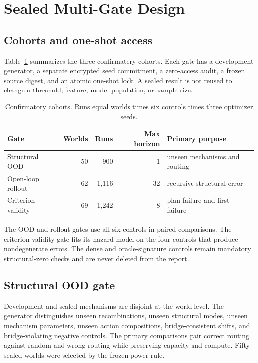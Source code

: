 \section{Sealed Multi-Gate Design}
\label{sec:design}

\subsection{Cohorts and one-shot access}

Table~\ref{tab:gates} summarizes the three confirmatory cohorts.  Each gate has
a development generator, a separate encrypted seed commitment, a zero-access
audit, a frozen source digest, and an atomic one-shot lock.  A sealed result is
not reused to change a threshold, feature, model population, or sample size.

\begin{table}[ht]
\centering
\caption{Confirmatory cohorts.  Runs equal worlds times six controls times
three optimizer seeds.}
\label{tab:gates}
\begin{tabular}{lrrrl}
\toprule
Gate & Worlds & Runs & Max horizon & Primary purpose \\
\midrule
Structural OOD & 50 & 900 & 1 & unseen mechanisms and routing \\
Open-loop rollout & 62 & 1,116 & 32 & recursive structural error \\
Criterion validity & 69 & 1,242 & 8 & plan failure and first failure \\
\bottomrule
\end{tabular}
\end{table}

The OOD and rollout gates use all six controls in paired comparisons.  The
criterion-validity gate fits its hazard model on the four controls that produce
nondegenerate errors.  The dense and oracle-signature controls remain mandatory
structural-zero checks and are never deleted from the report.

\subsection{Structural OOD gate}

Development and sealed mechanisms are disjoint at the world level.  The
generator distinguishes unseen recombinations, unseen structural modes,
unseen mechanism parameters, unseen action compositions, bridge-consistent
shifts, and bridge-violating negative controls.  The primary comparisons pair
correct routing against random and wrong routing while preserving capacity and
compute.  Fifty sealed worlds were selected by the frozen power rule.

